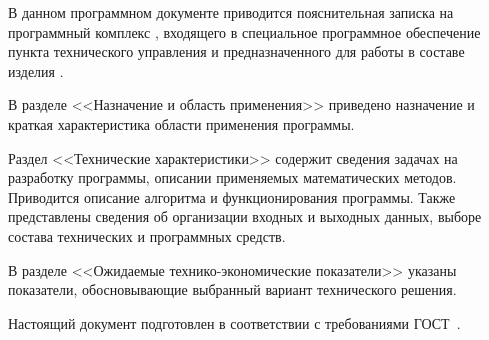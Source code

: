 \newpage\annotation

В данном программном документе приводится пояснительная записка на программный комплекс \programname, входящего в специальное программное обеспечение пункта технического управления и предназначенного для работы в составе изделия \productname.

В разделе <<Назначение и область применения>> приведено назначение и краткая характеристика области применения программы.

Раздел <<Технические характеристики>> содержит сведения задачах на разработку программы, описании применяемых
математических методов. Приводится описание алгоритма и функционирования программы. Также представлены сведения об организации входных и выходных данных, выборе состава технических и программных средств.

В разделе <<Ожидаемые технико-экономические показатели>> указаны показатели, обосновывающие выбранный вариант технического решения.

Настоящий документ подготовлен в соответствии с требованиями ГОСТ~\cite{gost19404}.
